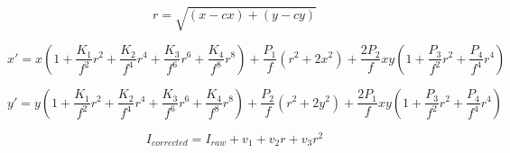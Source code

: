 \begin{equation}
r = \sqrt{(x-cx)+(y-cy)}
\label{eq:distortionr}
\end{equation}

\begin{equation}
x' = x(1 + 
\dfrac{K_1}{f^2}r^2 + 
\dfrac{K_2}{f^4}r^4 + 
\dfrac{K_3}{f^6}r^6 + 
\dfrac{K_4}{f^8}r^8) + 
\dfrac{P_1}{f}(r^2+2x^2) +
\dfrac{2P_2}{f}xy (1+\dfrac{P_3}{f^2}r^2 + \dfrac{P_4}{f^4}r^4)
  \label{eq:distortionx}
\end{equation}

\begin{equation}
y' = y(1 + 
\dfrac{K_1}{f^2}r^2 + 
\dfrac{K_2}{f^4}r^4 + 
\dfrac{K_3}{f^6}r^6 + 
\dfrac{K_4}{f^8}r^8) + 
\dfrac{P_2}{f}(r^2+2y^2) +
\dfrac{2P_1}{f}xy (1+\dfrac{P_3}{f^2}r^2 + \dfrac{P_4}{f^4}r^4)
\label{eq:distortiony}
\end{equation}

\begin{equation}
I_{corrected} = I_{raw} + v_1 + v_2r + v_3r^2
\label{eq:vignetting}
\end{equation}